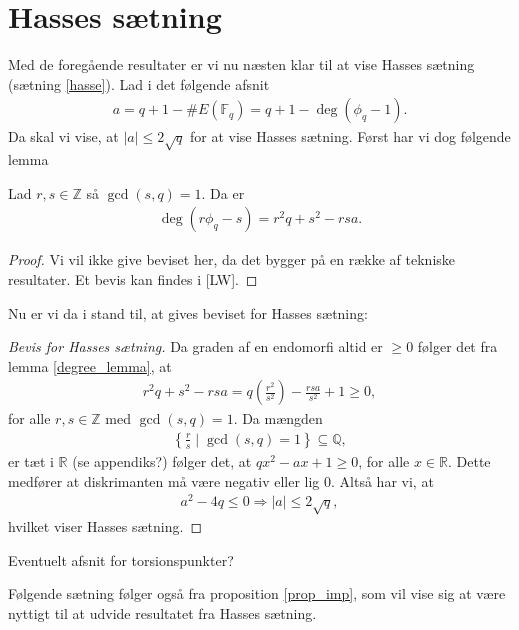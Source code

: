 \section{Hasses sætning}
Med de foregående resultater er vi nu næsten klar til at vise Hasses sætning (sætning \ref{hasse}). Lad i det følgende afsnit
\begin{align}
	\label{hasse_as}
	a = q + 1 - \#E(\mathbb{F}_q) = q + 1 - \deg(\phi_q - 1).
\end{align}
Da skal vi vise, at $|a| \leq 2 \sqrt{q}$ for at vise Hasses sætning. Først har vi dog følgende lemma

\begin{lemma}
\label{degree_lemma}
Lad $r, s \in \mathbb{Z}$ så $\gcd(s, q) = 1$. Da er 
\begin{align*}
	\deg(r \phi_q - s) = r^2 q + s^2 - rsa.
\end{align*}
\end{lemma}
\begin{proof}
Vi vil ikke give beviset her, da det bygger på en række af tekniske resultater. Et bevis kan findes i [LW].
\end{proof}

Nu er vi da i stand til, at gives beviset for Hasses sætning:

\begin{proof}[Bevis for Hasses sætning]
Da graden af en endomorfi altid er $\geq 0$ følger det fra lemma \ref{degree_lemma}, at 
\begin{align*}
	r^2q+s^2 -rsa = q \left( \frac{r^2}{s^2} \right) - \frac{rsa}{s^2} + 1 
	\geq 0,
\end{align*}
for alle $r, s \in \mathbb{Z}$ med $\gcd(s, q)=1$. Da mængden
\begin{align*}
	\left\{ \frac{r}{s} \mid \gcd(s, q)=1 \right\} \subseteq \mathbb{Q},
\end{align*}
er tæt i $\mathbb{R}$ (se appendiks?) følger det, at $qx^2 - ax + 1 \geq 0$,
for alle $x \in \mathbb{R}$. Dette medfører at diskrimanten må være negativ eller lig $0$.
Altså har vi, at 
\begin{align*}
	a^2 - 4q \leq 0 \Rightarrow |a| \leq 2 \sqrt{q},
\end{align*}
hvilket viser Hasses sætning.
\end{proof}

Eventuelt afsnit for torsionspunkter?

Følgende sætning følger også fra proposition \ref{prop_imp}, som vil vise sig at være nyttigt til at udvide resultatet fra Hasses sætning.

